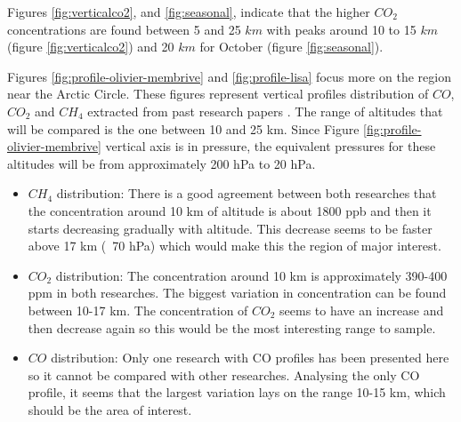 \documentclass[a4paper,12pt,oneside]{article} %
\begin{document}
\begin{appendices}
Figures \ref{fig:verticalco2}, and \ref{fig:seasonal}, indicate that the higher $CO_2$ concentrations are found between 5 and 25 $km$ with peaks around 10 to 15 $km$ (figure \ref{fig:verticalco2}) and 20 $km$ for October (figure \ref{fig:seasonal}).

\smallskip
Figures \ref{fig:profile-olivier-membrive} and \ref{fig:profile-lisa} focus more on the region near the Arctic Circle. These figures represent vertical profiles distribution of $CO$, $CO_2$ and $CH_4$ extracted from past research papers \cite{LISA} \cite{Membrive}. The range of altitudes that will be compared is the one between 10 and 25 km. Since Figure \ref{fig:profile-olivier-membrive} vertical axis is in pressure, the equivalent pressures for these altitudes will be from approximately 200 hPa to 20 hPa. 

\begin{itemize}
    \item $CH_4$ distribution: There is a good agreement between both researches that the concentration around 10 km of altitude is about 1800 ppb and then it starts decreasing gradually with altitude. This decrease seems to be faster above 17 km (~70 hPa) which would make this the region of major interest. 
    \item $CO_2$ distribution: The concentration around 10 km is approximately 390-400 ppm in both researches. The biggest variation in concentration can be found between 10-17 km. The concentration of $CO_2$ seems to have an increase and then decrease again so this would be the most interesting range to sample. 
    \item $CO$ distribution: Only one research with CO profiles has been presented here so it cannot be compared with other researches. Analysing the only CO profile, it seems that the largest variation lays on the range 10-15 km, which should be the area of interest. 
\end{itemize}


\end{appendices}
\end{document}
